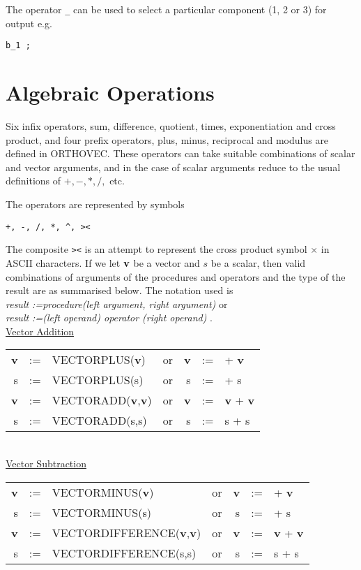 The operator {\tt \_} can be used to select a particular 
component (1, 2 or 3) for output e.g.
\begin{verbatim}
b_1 ;
\end{verbatim}

\section{Algebraic Operations}

Six infix operators, sum, difference, quotient, times, exponentiation
and cross product, and four prefix
operators, plus, minus, reciprocal
and  modulus are defined in ORTHOVEC.  These operators can take suitable
combinations of scalar and vector arguments,
and in the case of scalar arguments reduce to the usual definitions of
$ +, -, *, /, $ etc.

The operators are represented by symbols 
\begin{verbatim}  
+, -, /, *, ^, ><
\end{verbatim}

The composite {\tt ><} is an
attempt to represent the cross product symbol 
$\times$ in ASCII characters.
If we let ${\bf v}$ be a vector and $s$ be a scalar, then
valid combinations of arguments of the 
procedures and operators and the type of the result 
are as summarised below.  The notation used is\\
{\em result :=procedure(left argument, right argument) } or\\
{\em result :=(left operand) operator (right operand) } . \\

\underline{Vector Addition} \\
\begin{tabular}{rclcrcl}
{\bf v} &:=& VECTORPLUS({\bf v})  &{\rm or}& {\bf v} &:=&  +  {\bf v} \\
     s  &:=& VECTORPLUS(s)  &{\rm or} &      s  &:=&  +       s  \\
{\bf v} &:=& VECTORADD({\bf v},{\bf v})  &{\rm or }& {\bf v} &:=&  
{\bf v} +  {\bf v} \\
     s  &:=& VECTORADD(s,s)  &{\rm or }&      s  &:=&  s + s \\
\end{tabular} \\

\underline{Vector Subtraction} \\
\begin{tabular}{rclcrcl}
{\bf v} &:=& VECTORMINUS({\bf v})  &{\rm or}&
 {\bf v} &:=&  +  {\bf v} \\
 s  &:=& VECTORMINUS(s)  &{\rm or} &      s  &:=&  +       s  \\
{\bf v} &:=& VECTORDIFFERENCE({\bf v},{\bf v})  &{\rm or }& {\bf v} &:=&
  {\bf v} +  {\bf v} \\
 s  &:=& VECTORDIFFERENCE(s,s)  &{\rm or }&      s  &:=&  s + s \\
\end{tabular} \\

